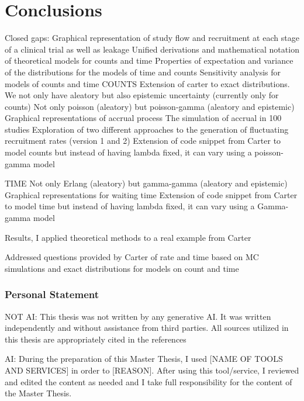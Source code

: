 

\chapter{Conclusions}

Closed gaps:
Graphical representation of study flow and recruitment at each stage of a clinical trial as well as leakage
Unified derivations and mathematical notation of theoretical models for counts and time
Properties of expectation and variance of the distributions for the models of time and counts
Sensitivity analysis for models of counts and time 
COUNTS
Extension of carter to exact distributions. 
We not only have aleatory but also epistemic uncertainty (currently only for counts)
Not only poisson (aleatory) but poisson-gamma (aleatory and epistemic)
Graphical representations of accrual process
The simulation of accrual in 100 studies 
Exploration of two different approaches to the generation of fluctuating recruitment rates (version 1 and 2)
Extension of code snippet from Carter to model counts but instead of having lambda fixed, it can vary using a poisson-gamma model

TIME
Not only Erlang (aleatory) but gamma-gamma (aleatory and epistemic)
Graphical representations for waiting time
Extension of code snippet from Carter to model time but instead of having lambda fixed, it can vary using a Gamma-gamma model 
 
Results, I applied theoretical methods to a real example from Carter

Addressed questions provided by Carter of rate and time based on MC simulations and exact distributions for models on count and time

\subsection{Personal Statement}

NOT AI:
This thesis was not written by any generative AI. It was written independently and
without assistance from third parties. All sources utilized in this thesis are appropriately cited in the references

AI:
During the preparation of this Master Thesis, I used [NAME OF TOOLS AND SERVICES] in order to [REASON]. After using this tool/service, I reviewed and edited the content as needed and I take full responsibility for the content of the Master Thesis.



